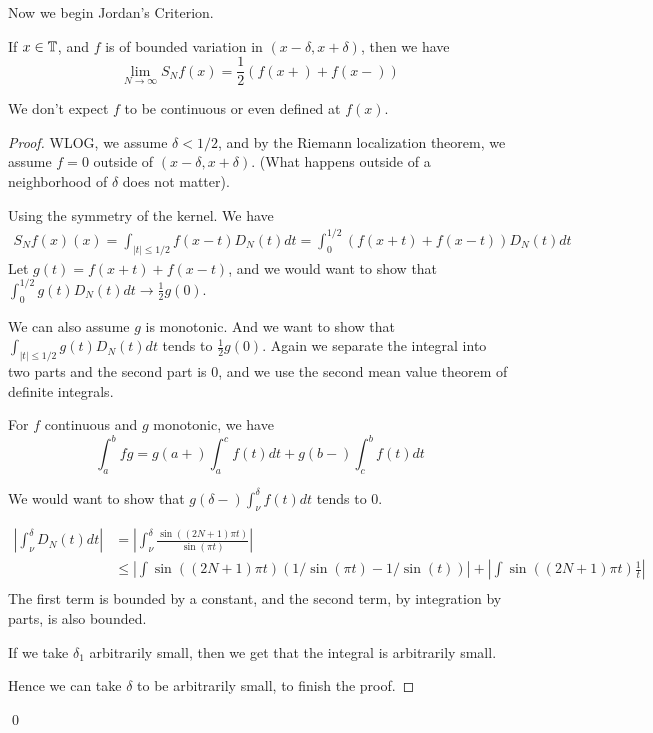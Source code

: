 Now we begin Jordan's Criterion.
\begin{theorem}
    If $x\in\mathbb{T}$, and $f$ is of bounded variation in $(x-\delta, x+\delta)$, then we have
    \begin{equation*}
        \lim_{N\to\infty}S_Nf(x)=\frac{1}{2}(f(x+)+f(x-))
    \end{equation*}
\end{theorem}
\begin{remark}
    We don't expect $f$ to be continuous or even defined at $f(x)$.
\end{remark}
\begin{proof}
    WLOG, we assume $\delta<1/2$, and by the Riemann localization theorem, we assume $f=0$ outside of $(x-\delta, x+\delta)$. (What happens outside of a neighborhood of $\delta$ does not matter).

    Using the symmetry of the kernel. We have
    \begin{align*}
        S_Nf(x)(x)=\int_{|t|\leq1/2}f(x-t)D_N(t)dt=\int_0^{1/2}(f(x+t)+f(x-t))D_N(t)dt
    \end{align*}
    Let $g(t)=f(x+t)+f(x-t)$, and we would want to show that $\int_0^{1/2}g(t)D_N(t)dt\to\frac{1}{2}g(0)$.

    We can also assume $g$ is monotonic. And we want to show that $\int_{|t|\leq1/2}g(t)D_N(t)dt$ tends to $\frac{1}{2}g(0)$. Again we separate the integral into two parts and the second part is 0, and we use the second mean value theorem of definite integrals.
    \begin{lemma}
        For $f$ continuous and $g$ monotonic, we have
        \begin{equation*}
            \int_a^bfg=g(a+)\int_a^c f(t)dt+g(b-)\int_c^bf(t)dt
        \end{equation*}
    \end{lemma}
    We would want to show that $g(\delta-)\int_\nu^\delta f(t)dt$ tends to 0.

    \begin{align*}
        \left|\int_\nu^\delta D_N(t)dt\right|&=\left|\int_\nu^\delta \frac{\sin((2N+1)\pi t)}{\sin(\pi t)}\right|\\
        &\leq\left|\int\sin((2N+1)\pi t)(1/\sin(\pi t)-1/\sin(t))\right|+\left|\int\sin((2N+1)\pi t)\frac{1}{t} \right|\\
    \end{align*}
    The first term is bounded by a constant, and the second term, by integration by parts, is also bounded.

    \begin{remark}
        If we take $\delta_1$ arbitrarily small, then we get that the integral is arbitrarily small.
    \end{remark}
    Hence we can take $\delta$ to be arbitrarily small, to finish the proof.
\end{proof}
\qed




